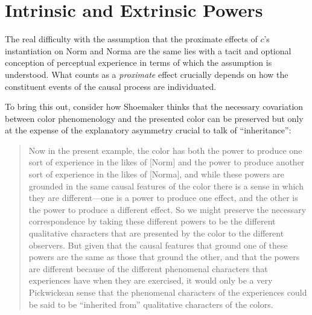 \documentclass[12pt]{article}
\begin{document}

\section{Intrinsic and Extrinsic Powers}\label{sec:intrinsic_and_extrinsic_powers} 

The real difficulty with the assumption that the proximate effects of $c$'s instantiation on Norm and Norma are the same lies with a tacit and optional conception of perceptual experience in terms of which the assumption is understood. What counts as a \emph{proximate} effect crucially depends on how the constituent events of the causal process are individuated.

To bring this out, consider how Shoemaker thinks that the necessary covariation between color phenomenology and the presented color can be preserved but only at the expense of the explanatory asymmetry crucial to talk of ``inheritance'': 
\begin{quote}
	Now in the present example, the color has both the power to produce one sort of experience in the likes of [Norm] and the power to produce another sort of experience in the likes of [Norma], and while these powers are grounded in the same causal features of the color there is a sense in which they are different---one is a power to produce one effect, and the other is the power to produce a different effect. So we might preserve the necessary correspondence by taking these different powers to be the different qualitative characters that are presented by the color to the different observers. But given that the causal features that ground one of these powers are the same as those that ground the other, and that the powers are different because of the different phenomenal characters that experiences have when they are exercised, it would only be a very Pickwickean sense that the phenomenal characters of the experiences could be said to be ``inherited from'' qualitative characters of the colors. \citep[476, n. 8]{Shoemaker:2006vn} 
\end{quote}
\end{document}
